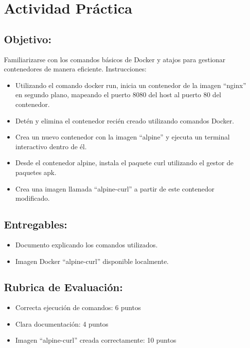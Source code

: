 \documentclass[
  a4paper,
  DIV=11,
  numbers=noendperiod,
  onepage,
  openany]{scrreprt}
\providecommand{\tightlist}{%
  \setlength{\itemsep}{0pt}\setlength{\parskip}{0pt}}\usepackage{longtable,booktabs,array}
\begin{document}
\hypertarget{actividad-pruxe1ctica}{%
\chapter{Actividad Práctica}\label{actividad-pruxe1ctica}}

\hypertarget{objetivo}{%
\section{Objetivo:}\label{objetivo}}

Familiarizarse con los comandos básicos de Docker y atajos para
gestionar contenedores de manera eficiente. Instrucciones:

\begin{itemize}
\tightlist
\item
  Utilizando el comando docker run, inicia un contenedor de la imagen
  ``nginx'' en segundo plano, mapeando el puerto 8080 del host al puerto
  80 del contenedor.
\item
  Detén y elimina el contenedor recién creado utilizando comandos
  Docker.
\item
  Crea un nuevo contenedor con la imagen ``alpine'' y ejecuta un
  terminal interactivo dentro de él.
\item
  Desde el contenedor alpine, instala el paquete curl utilizando el
  gestor de paquetes apk.
\item
  Crea una imagen llamada ``alpine-curl'' a partir de este contenedor
  modificado.
\end{itemize}

\hypertarget{entregables}{%
\section{Entregables:}\label{entregables}}

\begin{itemize}
\tightlist
\item
  Documento explicando los comandos utilizados.
\item
  Imagen Docker ``alpine-curl'' disponible localmente.
\end{itemize}

\hypertarget{rubrica-de-evaluaciuxf3n}{%
\section{Rubrica de Evaluación:}\label{rubrica-de-evaluaciuxf3n}}

\begin{itemize}
\tightlist
\item
  Correcta ejecución de comandos: 6 puntos
\item
  Clara documentación: 4 puntos
\item
  Imagen ``alpine-curl'' creada correctamente: 10 puntos
\end{itemize}
\end{document}
